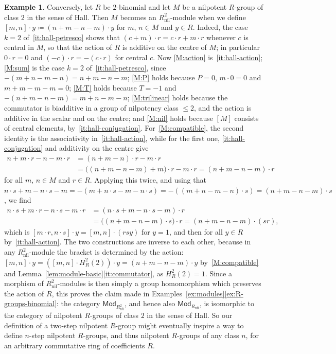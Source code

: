 \documentclass[reqno,a4paper]{amsart}
\theoremstyle{plain}
\theoremstyle{definition}
\newtheorem{example}[subsection]{Example}
\newcommand{\DefEq}{\coloneq}
\newcommand{\Mod}{\ensuremath{\mathsf{Mod}}}
\DeclareMathOperator{\nil}{nil}
\newcommand{\brk}[2]{\ensuremath{[#1,#2]}}
\begin{document}
\begin{example}
  Conversely, let \(R\) be \(2\)-binomial and let \(M\) be a nilpotent \(R\)-group of class \(2\) in the sense of Hall. Then \(M\) becomes an \(R_{\nil}^{2}\)-module when we define \(\brk{m}{n}\cdot y\DefEq(n+m-n-m)\cdot y\) for \(m\), \(n\in M\) and \(y\in R\). Indeed, the case \(k=2\) of~\ref{it:hall-petresco} shows that \((c+m)\cdot r=c\cdot r+m\cdot r\) whenever \(c\) is central in \(M\), so that the action of \(R\) is additive on the centre of \(M\); in particular \(0\cdot r=0\) and \((-c)\cdot r=-(c\cdot r)\) for central \(c\). Now \ref{M:action} is~\ref{it:hall-action}; \ref{M:sum} is the case \(k=2\) of~\ref{it:hall-petresco}, since \(-(m+n-m-n)=n+m-n-m\); \ref{M:P} holds because \(P=0\), \(m\cdot 0=0\) and \(m+m-m-m=0\); \ref{M:T} holds because \(T=-1\) and \(-(n+m-n-m)=m+n-m-n\); \ref{M:trilinear} holds because the commutator is biadditive in a group of nilpotency class \(\leq 2\), and the action is additive in the scalar and on the centre; and \ref{M:nil} holds because \([M]\) consists of central elements, by~\ref{it:hall-conjugation}. For~\ref{M:compatible}, the second identity is the associativity in~\ref{it:hall-action}, while for the first one, \ref{it:hall-conjugation} and additivity on the centre give
  \begin{align*}
    n+m\cdot r-n-m\cdot r & =(n+m-n)\cdot r-m\cdot r                                  \\
                          & =\bigl((n+m-n-m)+m\bigr)\cdot r-m\cdot r=(n+m-n-m)\cdot r
  \end{align*}
  for all \(m\), \(n\in M\) and \(r\in R\). Applying this twice, and using that \(n\cdot s+m-n\cdot s-m=-(m+n\cdot s-m-n\cdot s)=-((m+n-m-n)\cdot s)=(n+m-n-m)\cdot s\), we find
  \begin{align*}
    n\cdot s+m\cdot r-n\cdot s-m\cdot r & =(n\cdot s+m-n\cdot s-m)\cdot r                                 \\
                                        & =\bigl((n+m-n-m)\cdot s\bigr)\cdot r=(n+m-n-m)\cdot(sr)\text{,}
  \end{align*}
  which is \(\brk{m\cdot r}{n\cdot s}\cdot y=\brk{m}{n}\cdot(rsy)\) for \(y=1\), and then for all \(y\in R\) by~\ref{it:hall-action}. The two constructions are inverse to each other, because in any \(R_{\nil}^{2}\)-module the bracket is determined by the action: \(\brk{m}{n}\cdot y=(\brk{m}{n}\cdot H_{R}^{2}(2))\cdot y=(n+m-n-m)\cdot y\) by~\ref{M:compatible} and Lemma~\ref{lem:module-basic}\ref{it:commutator}, as \(H_{R}^{2}(2)=1\). Since a morphism of \(R_{\nil}^{2}\)-modules is then simply a group homomorphism which preserves the action of \(R\), this proves the claim made in Examples~\ref{ex:modules}\ref{ex:R-groups-binomial}: the category \(\Mod_{R_{\nil}^{2}}\), and hence also \(\Mod_{R_{\nil}}\), is isomorphic to the category of nilpotent \(R\)-groups of class \(2\) in the sense of Hall. So our definition of a two-step nilpotent \(R\)-group might eventually inspire a way to define \(n\)-step nilpotent \(R\)-groups, and thus nilpotent \(R\)-groups of any class \(n\), for an arbitrary commutative ring of coefficients \(R\).
\end{example}
\end{document}

